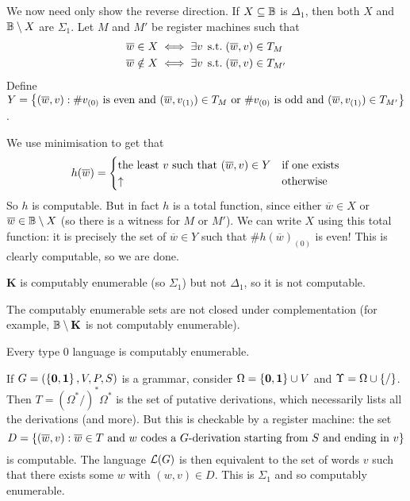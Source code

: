 \documentclass{article}
\begin{document}
\begin{prf}
	We now need only show the reverse direction. If $X \subseteq \mathbb{B}$ is $\Delta_1$, then both $X$ and $\mathbb{B} \setminus X$ are $\Sigma_1$. Let $M$ and $M'$ be register machines such that
	\begin{align*}
		\overline w \in X    & \iff \exists v \mathrel{\, \text{s.t.}} (\overline w, v) \in T_{M}  \\
		\overline w \notin X & \iff \exists v \mathrel{\, \text{s.t.}} (\overline w, v) \in T_{M'} 
	\end{align*}
	Define $Y = \left\lbrace (\overline w, v) : \#v_{(0)} \text{ is even and } (\overline w, v_{(1)}) \in T_{M} \text{ or } \#v_{(0)} \text{ is odd and } (\overline w, v_{(1)}) \in T_{M'} \right\rbrace$.
		
	We use minimisation to get that
	\[
		h (\overline w) = \begin{cases}
		\text{the least $v$ such that $(\overline w, v) \in Y$} & \text{if one exists} \\
		\uparrow & \!\mathrel{\, \text{otherwise}}
		\end{cases}
	\]
	So $h$ is computable. But in fact $h$ is a total function, since either $\overline w \in X$ or $\overline w \in \mathbb{B} \setminus X$ (so there is a witness for $M$ or $M'$). We can write $X$ using this total function: it is precisely the set of $\overline w \in Y$ such that $\# h(\overline w)_{(0)}$ is even! This is clearly computable, so we are done.
\end{prf}

\begin{corollary}
	$\mathbf{K}$ is computably enumerable (so $\Sigma_1$) but not $\Delta_1$, so it is not computable.
\end{corollary}

\begin{corollary}
	The computably enumerable sets are not closed under complementation (for example, $\mathbb{B} \setminus \mathbf{K}$ is not computably enumerable).
\end{corollary}

\begin{corollary}
	Every type 0 language is computably enumerable.
\end{corollary}

\begin{prf}
	If $G = (\left\lbrace \textbf{0}, \textbf{1} \right\rbrace, V, P, S)$ is a grammar, consider $\Omega = \left\lbrace \textbf{0}, \textbf{1} \right\rbrace \cup V$ and $\Upsilon = \Omega \cup \left\lbrace / \right\rbrace$. Then $T = (\Omega^* /)^*\Omega^*$ is the set of putative derivations, which necessarily lists all the derivations (and more). But this is checkable by a register machine: the set
	\[
		D = \left\lbrace (\overline w, v) : \overline w \in T \text{ and $w$ codes a $G$-derivation starting from $S$ and ending in $v$} \right\rbrace
	\]
	is computable. The language $\mathcal{L}(G)$ is then equivalent to the set of words $v$ such that there exists some $w$ with $(w, v) \in D$. This is $\Sigma_1$ and so computably enumerable.
\end{prf}
\end{document}
